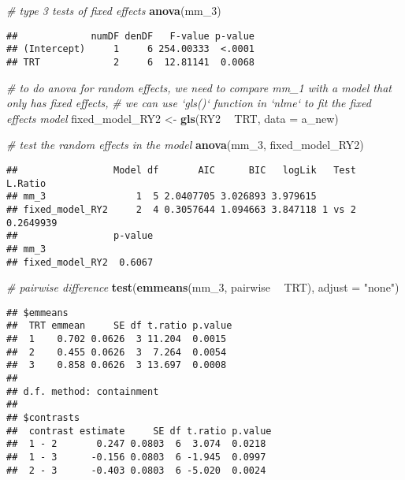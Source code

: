 \documentclass[]{book}
\newenvironment{Shaded}{\begin{snugshade}}{\end{snugshade}}
\newcommand{\CommentTok}[1]{\textcolor[rgb]{0.56,0.35,0.01}{\textit{#1}}}
\newcommand{\DataTypeTok}[1]{\textcolor[rgb]{0.13,0.29,0.53}{#1}}
\newcommand{\DecValTok}[1]{\textcolor[rgb]{0.00,0.00,0.81}{#1}}
\newcommand{\KeywordTok}[1]{\textcolor[rgb]{0.13,0.29,0.53}{\textbf{#1}}}
\newcommand{\NormalTok}[1]{#1}
\newcommand{\OperatorTok}[1]{\textcolor[rgb]{0.81,0.36,0.00}{\textbf{#1}}}
\newcommand{\StringTok}[1]{\textcolor[rgb]{0.31,0.60,0.02}{#1}}
\begin{document}
\begin{Shaded}
\begin{Highlighting}[]
\CommentTok{# type 3 tests of fixed effects}
\KeywordTok{anova}\NormalTok{(mm_}\DecValTok{3}\NormalTok{)}
\end{Highlighting}
\end{Shaded}

\begin{verbatim}
##             numDF denDF   F-value p-value
## (Intercept)     1     6 254.00333  <.0001
## TRT             2     6  12.81141  0.0068
\end{verbatim}

\begin{Shaded}
\begin{Highlighting}[]
\CommentTok{# to do anova for random effects, we need to compare mm_1 with a model that only has fixed effects,}
\CommentTok{# we can use `gls()` function in `nlme` to fit the fixed effects model}
\NormalTok{fixed_model_RY2 <-}\StringTok{ }\KeywordTok{gls}\NormalTok{(RY2 }\OperatorTok{~}\StringTok{ }\NormalTok{TRT,}
                                     \DataTypeTok{data =}\NormalTok{ a_new)}

\CommentTok{# test the random effects in the model}
\KeywordTok{anova}\NormalTok{(mm_}\DecValTok{3}\NormalTok{, fixed_model_RY2)}
\end{Highlighting}
\end{Shaded}

\begin{verbatim}
##                 Model df       AIC      BIC   logLik   Test   L.Ratio
## mm_3                1  5 2.0407705 3.026893 3.979615                 
## fixed_model_RY2     2  4 0.3057644 1.094663 3.847118 1 vs 2 0.2649939
##                 p-value
## mm_3                   
## fixed_model_RY2  0.6067
\end{verbatim}

\begin{Shaded}
\begin{Highlighting}[]
\CommentTok{# pairwise difference}
\KeywordTok{test}\NormalTok{(}\KeywordTok{emmeans}\NormalTok{(mm_}\DecValTok{3}\NormalTok{, pairwise }\OperatorTok{~}\StringTok{ }\NormalTok{TRT), }\DataTypeTok{adjust =} \StringTok{"none"}\NormalTok{)}
\end{Highlighting}
\end{Shaded}

\begin{verbatim}
## $emmeans
##  TRT emmean     SE df t.ratio p.value
##  1    0.702 0.0626  3 11.204  0.0015 
##  2    0.455 0.0626  3  7.264  0.0054 
##  3    0.858 0.0626  3 13.697  0.0008 
## 
## d.f. method: containment 
## 
## $contrasts
##  contrast estimate     SE df t.ratio p.value
##  1 - 2       0.247 0.0803  6  3.074  0.0218 
##  1 - 3      -0.156 0.0803  6 -1.945  0.0997 
##  2 - 3      -0.403 0.0803  6 -5.020  0.0024
\end{verbatim}
\end{document}
